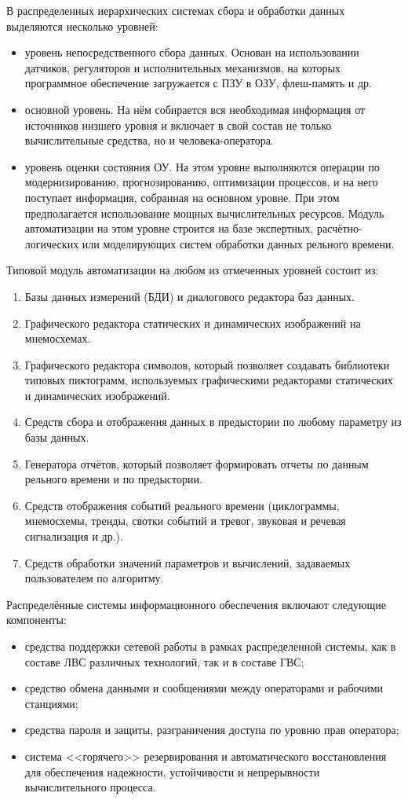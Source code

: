 В распределенных иерархических системах сбора и обработки данных
выделяются несколько уровней:
\begin{itemize}
\item уровень непосредственного сбора данных. Основан на использовании
  датчиков, регуляторов и исполнительных механизмов, на которых
  программное обеспечение загружается с ПЗУ в ОЗУ, флеш-память и др.
\item основной уровень. На нём собирается вся необходимая информация
  от источников низшего уровня и включает в свой состав не только
  вычислительные средства, но и человека-оператора.
\item уровень оценки состояния ОУ. На этом уровне выполняются операции
  по модернизированию, прогнозированию, оптимизации процессов, и на
  него поступает информация, собранная на основном уровне. При этом
  предполагается использование мощных вычислительных ресурсов. Модуль
  автоматизации на этом уровне строится на базе экспертных,
  расчётно-логических или моделирующих систем обработки данных
  рельного времени.
\end{itemize}

Типовой модуль автоматизации на любом из отмеченных уровней состоит
из:
\begin{enumerate}
\item Базы данных измерений (БДИ) и диалогового редактора баз данных.
\item Графического редактора статических и динамических изображений на
  мнемосхемах.
\item Графического редактора символов, который позволяет создавать
  библиотеки типовых пиктограмм, используемых графическими редакторами
  статических и динамических изображений.
\item Средств сбора и отображения данных в предыстории по любому
  параметру из базы данных.
\item Генератора отчётов, который позволяет формировать отчеты по
  данным рельного времени и по предыстории.
\item Средств отображения событий реального времени (циклограммы,
  мнемосхемы, тренды, свотки событий и тревог, звуковая и речевая
  сигнализация и др.).
\item Средств обработки значений параметров и вычислений, задаваемых
  пользователем по алгоритму.
\end{enumerate}

Распределённые системы информационного обеспечения включают следующие
компоненты:
\begin{itemize}
\item средства поддержки сетевой работы в рамках распределенной
  системы, как в составе ЛВС различных технологий, так и в составе
  ГВС;
\item средство обмена данными и сообщениями между операторами и
  рабочими станциями;
\item средства пароля и защиты, разграничения доступа по уровню прав
  оператора;
\item система <<горячего>> резервирования и автоматического
  восстановления для обеспечения надежности, устойчивости и
  непрерывности вычислительного процесса.
\end{itemize}

